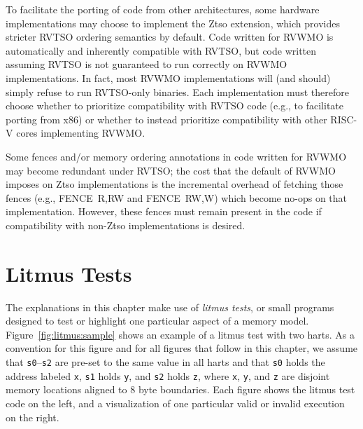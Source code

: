 To facilitate the porting of code from other architectures, some hardware implementations may choose to implement the Ztso extension, which provides stricter RVTSO ordering semantics by default.
Code written for RVWMO is automatically and inherently compatible with RVTSO, but code written assuming RVTSO is not guaranteed to run correctly on RVWMO implementations.
In fact, most RVWMO implementations will (and should) simply refuse to run RVTSO-only binaries.
Each implementation must therefore choose whether to prioritize compatibility with RVTSO code (e.g., to facilitate porting from x86) or whether to instead prioritize compatibility with other RISC-V cores implementing RVWMO.

Some fences and/or memory ordering annotations in code written for RVWMO may become redundant under RVTSO; the cost that the default of RVWMO imposes on Ztso implementations is the incremental overhead of fetching those fences (e.g., FENCE~R,RW and FENCE~RW,W) which become no-ops on that implementation.
However, these fences must remain present in the code if compatibility with non-Ztso implementations is desired.

\section{Litmus Tests}\label{sec:litmustests}
The explanations in this chapter make use of {\em litmus tests}, or small programs designed to test or highlight one particular aspect of a memory model.
Figure~\ref{fig:litmus:sample} shows an example of a litmus test with two harts.
As a convention for this figure and for all figures that follow in this chapter, we assume that {\tt s0}--{\tt s2} are pre-set to the same value in all harts and that {\tt s0} holds the address labeled {\tt x}, {\tt s1} holds {\tt y}, and {\tt s2} holds {\tt z}, where {\tt x}, {\tt y}, and {\tt z} are disjoint memory locations aligned to 8 byte boundaries.
Each figure shows the litmus test code on the left, and a visualization of one particular valid or invalid execution on the right.

